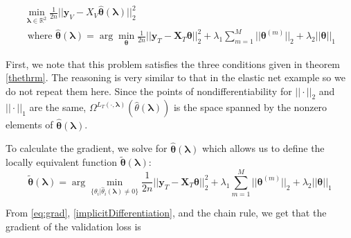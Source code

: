\documentclass[10pt,letterpaper]{article}
\begin{document}
\begin{equation}
\begin{array}{c}
\min_{\boldsymbol{\lambda} \in \mathbb{R}^2} \frac{1}{2n} \bigl\lvert\bigl\lvert \boldsymbol{y}_V - X_V \hat{\boldsymbol{\theta}}(\boldsymbol{\lambda}) \bigl\rvert\bigl\rvert^2_2 \\
\text{ where }
\hat{\boldsymbol{\theta}}(\boldsymbol{\lambda}) = \arg\min_{\boldsymbol{\theta}} \frac{1}{2n} \bigl\lvert\bigl\lvert \boldsymbol{y}_T - \boldsymbol{X}_T \boldsymbol{\theta} \bigl\rvert\bigl\rvert^2_2
+ \lambda_1 \sum_{m=1}^M \lvert\lvert \boldsymbol\theta^{(m)} \rvert \rvert_2
+ \lambda_2 \lvert\lvert \boldsymbol\theta \rvert \rvert_1
\end{array}
\end{equation}

First, we note that this problem satisfies the three conditions given in theorem \ref{thethrm}. The reasoning is very similar to that in the elastic net example so we do not repeat them here. Since the points of nondifferentiability for $||\cdot||_2$ and $||\cdot||_1$ are the same, $\Omega^{L_T(\cdot, \boldsymbol{\lambda})}(\hat{\theta}\left(\boldsymbol{\lambda}\right))$ is the space spanned by the nonzero elements of $\hat{\boldsymbol{\theta}}(\boldsymbol{\lambda})$.

To calculate the gradient, we solve for $\hat{\boldsymbol{\theta}}(\boldsymbol{\lambda})$ which allows us to define the locally equivalent function $\tilde{\boldsymbol{\theta}}(\boldsymbol{\lambda})$:
\begin{equation}
\tilde{\boldsymbol{\theta}}(\boldsymbol{\lambda}) = \arg\min_{\{\theta_i | \hat{\theta}_i(\boldsymbol{\lambda}) \ne 0 \} }
\frac{1}{2n} \bigl\lvert\bigl\lvert \boldsymbol{y}_T - \boldsymbol{X}_T \boldsymbol{\theta} \bigl\rvert\bigl\rvert^2_2
+ \lambda_1 \sum_{m=1}^M \lvert\lvert \boldsymbol\theta^{(m)} \rvert \rvert_2
+ \lambda_2 \lvert\lvert \boldsymbol\theta \rvert \rvert_1
\end{equation}

From \eqref{eq:grad}, \eqref{implicitDifferentiation}, and the chain rule, we get that the gradient of the validation loss is
\end{document}
